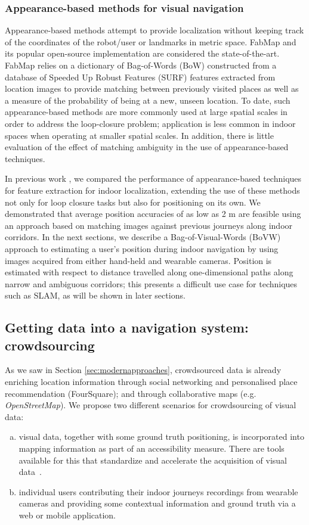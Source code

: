 \subsubsection{Appearance-based methods for visual navigation}
Appearance-based methods attempt to provide localization without keeping track of the coordinates of the robot/user or landmarks in metric space. FabMap \citep{cumminsFabMap2010} and its popular open-source implementation \citep{OpenFabMap2011} are considered the state-of-the-art. FabMap relies on a dictionary of Bag-of-Words (BoW) constructed from a database of Speeded Up Robust Features (SURF) features extracted from location images to provide matching between previously visited places as well as a measure of the probability of being at a new, unseen location. To date, such appearance-based methods are more commonly used at large spatial scales in order to address the loop-closure problem; application is less common  in indoor spaces when operating at smaller spatial scales. In addition, there is little evaluation of the effect of matching ambiguity in the use of appearance-based techniques. 

In previous work \citep{RiveraWearable}, we compared the performance of appearance-based techniques for feature extraction for indoor localization, extending the use of these methods not only for loop closure tasks but also for positioning on its own. We demonstrated that average position accuracies of as low as 2 m are feasible using an approach based on matching images against previous journeys along indoor corridors.  In the next sections, we describe a Bag-of-Visual-Words (BoVW) approach to estimating a user's position during indoor navigation by using images acquired from either hand-held and wearable cameras.  Position is estimated with respect to distance travelled along one-dimensional paths along narrow and ambiguous corridors; this presents a difficult use case for techniques such as SLAM, as will be shown in later sections.

\subsection{Getting data into a navigation system: crowdsourcing}
As we saw in Section \ref{sec:modernapproaches}, crowdsourced data is already enriching location information through social networking and personalised place recommendation (FourSquare); and through collaborative maps (e.g. {\it OpenStreetMap}). We propose two different scenarios for crowdsourcing of visual data:
\begin{enumerate}[a)] 
\item  visual data, together with some ground truth positioning, is incorporated into mapping information as part of an accessibility measure. There are tools available for this that standardize and accelerate the acquisition of visual data~\citep{navvisTrolley}.
\item individual users contributing their indoor journeys recordings from wearable cameras and providing some contextual information and ground truth via a web or mobile application. 
\end{enumerate}

